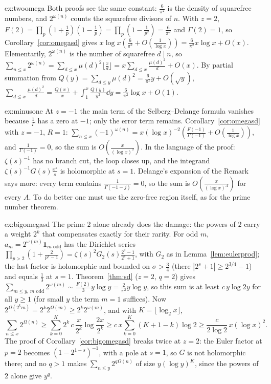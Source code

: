 \begin{solution}{ex:twoomega}
\idea Both proofs see the same constant: $\frac6{\pi^2}$ is the density of squarefree numbers, and $2^{\omega(n)}$ counts the squarefree divisors of $n$.
\writeup With $z=2$, $F(2)=\prod_p(1+\frac1p)(1-\frac1p)=\prod_p(1-\frac1{p^2})=\frac6{\pi^2}$ and $\Gamma(2)=1$, so Corollary~\ref{cor:omegasd} gives $x\log x(\frac6{\pi^2}+O(\frac1{\log x}))=\frac6{\pi^2}x\log x+O(x)$. Elementarily, $2^{\omega(n)}$ is the number of squarefree $d\mid n$, so $\sum_{n\le x}2^{\omega(n)}=\sum_{d\le x}\mu(d)^2\lfloor\frac xd\rfloor=x\sum_{d\le x}\frac{\mu(d)^2}d+O(x)$. By partial summation from $Q(y)=\sum_{d\le y}\mu(d)^2=\frac6{\pi^2}y+O(\sqrt y)$, $\sum_{d\le x}\frac{\mu(d)^2}d=\frac{Q(x)}x+\int_1^x\frac{Q(y)}{y^2}\dd y=\frac6{\pi^2}\log x+O(1)$.
\end{solution}

\begin{solution}{ex:minusone}
\idea At $z=-1$ the main term of the Selberg--Delange formula vanishes because $\frac1\Gamma$ has a zero at $-1$; only the error term remains.
\writeup Corollary~\ref{cor:omegasd} with $z=-1$, $R=1$: $\sum_{n\le x}(-1)^{\omega(n)}=x(\log x)^{-2}(\frac{F(-1)}{\Gamma(-1)}+O(\frac1{\log x}))$, and $\frac1{\Gamma(-1)}=0$, so the sum is $O(\frac x{(\log x)^3})$. In the language of the proof: $\zeta(s)^{-1}$ has no branch cut, the loop closes up, and the integrand $\zeta(s)^{-1}G(s)\frac{x^s}s$ is holomorphic at $s=1$. Delange's expansion of the Remark says more: every term contains $\frac1{\Gamma(-1-j)}=0$, so the sum is $O(\frac x{(\log x)^A})$ for every $A$. To do better one must use the zero-free region itself, as for the prime number theorem.
\end{solution}

\begin{solution}{ex:bigomegasd}
\idea The prime $2$ alone already does the damage: the powers of $2$ carry a weight $2^k$ that compensates exactly for their rarity.
\writeup For odd $m$, $a_m=2^{\omega(m)}\mathbf 1_{m\text{ odd}}$ has the Dirichlet series $\prod_{p>2}(1+\frac2{p^s-1})=\zeta(s)^2G_2(s)\frac{2^s-1}{2^s+1}$, with $G_2$ as in Lemma~\ref{lem:eulerprod}; the last factor is holomorphic and bounded on $\sigma>\frac34$ (there $|2^s+1|\ge2^{3/4}-1$) and equals $\frac13$ at $s=1$. Theorem~\ref{thm:sd} ($z=2$, $q=2$) gives $\sum_{m\le y,\,m\text{ odd}}2^{\omega(m)}\sim\frac{F(2)}3y\log y=\frac2{\pi^2}y\log y$, so this sum is at least $c\,y\log2y$ for all $y\ge1$ (for small $y$ the term $m=1$ suffices). Now $2^{\Omega(2^km)}=2^k2^{\Omega(m)}\ge2^k2^{\omega(m)}$, and with $K=\lfloor\log_2x\rfloor$,
\[
\sum_{n\le x}2^{\Omega(n)}\ge\sum_{k=0}^K2^k\,c\,\frac x{2^k}\log\frac{2x}{2^k}\ge c\,x\sum_{k=0}^K(K+1-k)\log2\ge\frac c{2\log2}\,x(\log x)^2.
\]
The proof of Corollary~\ref{cor:bigomegasd} breaks twice at $z=2$: the Euler factor at $p=2$ becomes $(1-2^{1-s})^{-1}$, with a pole at $s=1$, so $G$ is not holomorphic there; and no $q>1$ makes $\sum_{n\le y}2^{q\Omega(n)}$ of size $y(\log y)^K$, since the powers of $2$ alone give $y^q$.
\end{solution}

